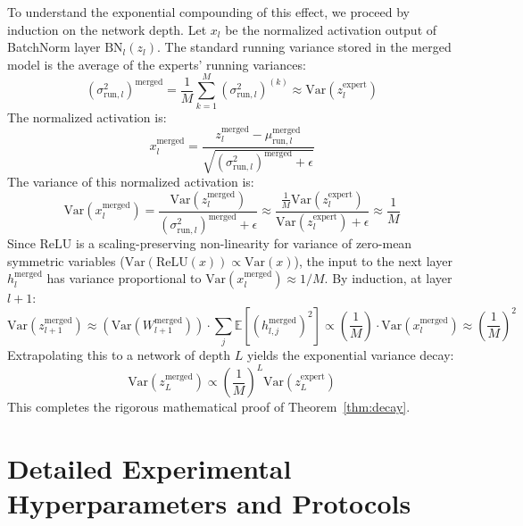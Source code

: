\documentclass{article}
\theoremstyle{plain}
\theoremstyle{definition}
\theoremstyle{remark}
\begin{document}
To understand the exponential compounding of this effect, we proceed by induction on the network depth. Let $x_l$ be the normalized activation output of BatchNorm layer $\text{BN}_l(z_l)$. The standard running variance stored in the merged model is the average of the experts' running variances:
\begin{equation}
(\sigma^2_{\text{run}, l})^{\text{merged}} = \frac{1}{M}\sum_{k=1}^M (\sigma^2_{\text{run}, l})^{(k)} \approx \text{Var}(z_l^{\text{expert}})
\end{equation}
The normalized activation is:
\begin{equation}
x_l^{\text{merged}} = \frac{z_{l}^{\text{merged}} - \mu_{\text{run}, l}^{\text{merged}}}{\sqrt{(\sigma_{\text{run}, l}^2)^{\text{merged}} + \epsilon}}
\end{equation}
The variance of this normalized activation is:
\begin{equation}
\text{Var}(x_l^{\text{merged}}) = \frac{\text{Var}(z_{l}^{\text{merged}})}{(\sigma_{\text{run}, l}^2)^{\text{merged}} + \epsilon} \approx \frac{\frac{1}{M} \text{Var}(z_{l}^{\text{expert}})}{\text{Var}(z_{l}^{\text{expert}}) + \epsilon} \approx \frac{1}{M}
\end{equation}
Since $\text{ReLU}$ is a scaling-preserving non-linearity for variance of zero-mean symmetric variables ($\text{Var}(\text{ReLU}(x)) \propto \text{Var}(x)$), the input to the next layer $h_l^{\text{merged}}$ has variance proportional to $\text{Var}(x_l^{\text{merged}}) \approx 1/M$. 
By induction, at layer $l+1$:
\begin{equation}
\text{Var}(z_{l+1}^{\text{merged}}) \approx \left( \text{Var}(W_{l+1}^{\text{merged}}) \right) \cdot \sum_j \mathbb{E}[(h_{l, j}^{\text{merged}})^2] \propto \left( \frac{1}{M} \right) \cdot \text{Var}(x_l^{\text{merged}}) \approx \left( \frac{1}{M} \right)^2
\end{equation}
Extrapolating this to a network of depth $L$ yields the exponential variance decay:
\begin{equation}
\text{Var}(z_{L}^{\text{merged}}) \propto \left( \frac{1}{M} \right)^L \text{Var}(z_{L}^{\text{expert}})
\end{equation}
This completes the rigorous mathematical proof of Theorem~\ref{thm:decay}.

\section{Detailed Experimental Hyperparameters and Protocols}
\label{app:hyperparams}
\end{document}
